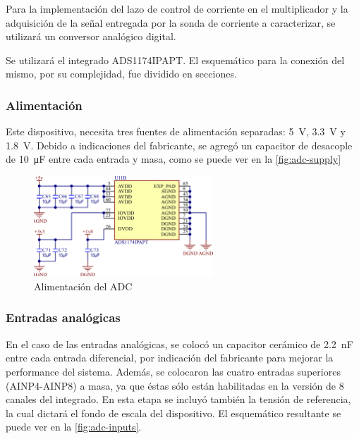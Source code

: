 \documentclass[../et.tex]{subfiles}
\begin{document}
Para la implementación del lazo de control de corriente en el multiplicador y la adquisición de la señal entregada por la sonda de corriente a caracterizar, se utilizará un conversor analógico digital.

Se utilizará el integrado ADS1174IPAPT. El esquemático para la conexión del mismo, por su complejidad, fue dividido en secciones.

\subsubsection{Alimentación}
Este dispositivo, necesita tres fuentes de alimentación separadas: \SI{5}{V}, \SI{3.3}{V} y \SI{1.8}{V}. Debido a indicaciones del fabricante, se agregó un capacitor de desacople de \SI{10}{\micro F} entre cada entrada y masa, como se puede ver en la \autoref{fig:adc-supply}

\begin{figure}[!htbp]
  \centering
  \includegraphics[width=0.6\textwidth]{../images/adc-supply.png}
  \caption{Alimentación del ADC}
  \label{fig:adc-supply}
\end{figure}

\subsubsection{Entradas analógicas}
En el caso de las entradas analógicas, se colocó un capacitor cerámico de \SI{2.2}{nF} entre cada entrada diferencial, por indicación del fabricante para mejorar la performance del sistema. Además, se colocaron las cuatro entradas superiores (AINP4-AINP8) a masa, ya que éstas sólo están habilitadas en la versión de 8 canales del integrado. En esta etapa se incluyó también la tensión de referencia, la cual dictará el fondo de escala del dispositivo. El esquemático resultante se puede ver en la \autoref{fig:adc-inputs}.
\end{document}
